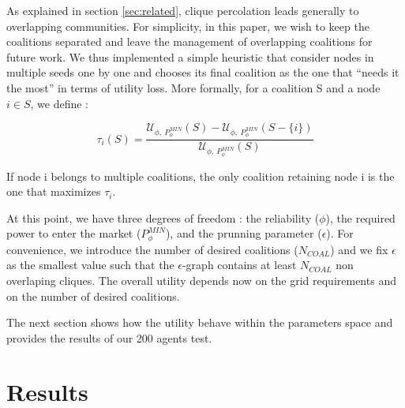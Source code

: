 \documentclass[conference]{IEEEtran}
\begin{document}
As explained in section \ref{sec:related}, clique percolation leads generally to overlapping communities. For simplicity, in this paper, we wish to keep the coalitions separated and  leave the management of overlapping coalitions for future work. We thus implemented a simple heuristic that consider nodes in multiple seeds one by one and chooses its final coalition as the one that “needs it the most” in terms of utility loss. More formally, for a coalition S and a node $ i \in S $, we define :

\begin{equation}
\tau_{i}(S) = \dfrac{\mathcal{U}_{\phi,\ P_{\phi}^{MIN}}(S) - \mathcal{U}_{\phi,\ P_{\phi}^{MIN}}(S-\{i\}) }{\mathcal{U}_{\phi,\ P_{\phi}^{MIN}}(S)}
\label{tau}
\end{equation}

If node i belongs to  multiple coalitions, the only coalition retaining node i is the one that maximizes $ \tau_{i} $.

At this point, we have three degrees of freedom : the reliability ($ \phi $), the required power to enter the market ($P_{\phi}^{MIN}$), and the prunning parameter ($\epsilon$). For convenience, we introduce the number of desired coalitions ($ N_{COAL} $) and we fix $\epsilon $ as the smallest value such that the $ \epsilon $-graph contains at least $ N_{COAL} $ non overlaping cliques. The overall utility depends now on the grid requirements and on the number of desired coalitions.

The next section shows how the utility behave within the parameters space and provides the results of our 200 agents test.

\section{Results}
\label{sec:results}
\end{document}
